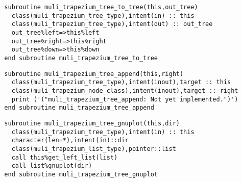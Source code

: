 \begin{Verbatim}
  subroutine muli_trapezium_tree_to_tree(this,out_tree)
    class(muli_trapezium_tree_type),intent(in) :: this
    class(muli_trapezium_tree_type),intent(out) :: out_tree
    out_tree%left=>this%left
    out_tree%right=>this%right
    out_tree%down=>this%down
  end subroutine muli_trapezium_tree_to_tree
\end{Verbatim}

\begin{Verbatim}
  subroutine muli_trapezium_tree_append(this,right)
    class(muli_trapezium_tree_type),intent(inout),target :: this
    class(muli_trapezium_node_class),intent(inout),target :: right
    print ('("muli_trapezium_tree_append: Not yet implemented.")')
  end subroutine muli_trapezium_tree_append
\end{Verbatim}

\begin{Verbatim}
  subroutine muli_trapezium_tree_gnuplot(this,dir)
    class(muli_trapezium_tree_type),intent(in) :: this
    character(len=*),intent(in)::dir
    class(muli_trapezium_list_type),pointer::list
    call this%get_left_list(list)
    call list%gnuplot(dir)
  end subroutine muli_trapezium_tree_gnuplot
\end{Verbatim}

